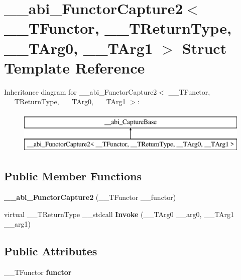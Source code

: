 \hypertarget{struct____abi___functor_capture2}{}\section{\+\_\+\+\_\+abi\+\_\+\+Functor\+Capture2$<$ \+\_\+\+\_\+\+T\+Functor, \+\_\+\+\_\+\+T\+Return\+Type, \+\_\+\+\_\+\+T\+Arg0, \+\_\+\+\_\+\+T\+Arg1 $>$ Struct Template Reference}
\label{struct____abi___functor_capture2}
Inheritance diagram for \+\_\+\+\_\+abi\+\_\+\+Functor\+Capture2$<$ \+\_\+\+\_\+\+T\+Functor, \+\_\+\+\_\+\+T\+Return\+Type, \+\_\+\+\_\+\+T\+Arg0, \+\_\+\+\_\+\+T\+Arg1 $>$\+:\begin{figure}[H]
\begin{center}
\leavevmode
\includegraphics[height=2.000000cm]{d0/daf/struct____abi___functor_capture2}
\end{center}
\end{figure}
\subsection*{Public Member Functions}
\begin{DoxyCompactItemize}
\item 
\mbox{\label{struct____abi___functor_capture2_a39802b6ea07877c3572760feed800de3}} 
{\bfseries \+\_\+\+\_\+abi\+\_\+\+Functor\+Capture2} (\+\_\+\+\_\+\+T\+Functor \+\_\+\+\_\+functor)
\item 
\mbox{\label{struct____abi___functor_capture2_a9ed12046b44620e5115ae4eaa68f44c3}} 
virtual \+\_\+\+\_\+\+T\+Return\+Type \+\_\+\+\_\+stdcall {\bfseries Invoke} (\+\_\+\+\_\+\+T\+Arg0 \+\_\+\+\_\+arg0, \+\_\+\+\_\+\+T\+Arg1 \+\_\+\+\_\+arg1)
\end{DoxyCompactItemize}
\subsection*{Public Attributes}
\begin{DoxyCompactItemize}
\item 
\mbox{\label{struct____abi___functor_capture2_a7911adb441169b31559454d2b9bcfbde}} 
\+\_\+\+\_\+\+T\+Functor {\bfseries functor}
\end{DoxyCompactItemize}

